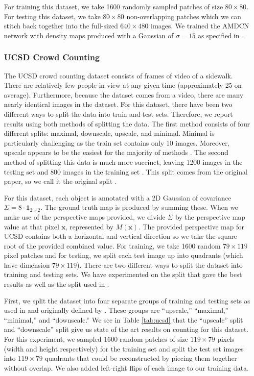 \documentclass[10pt,twocolumn,letterpaper]{article}
\begin{document}
For training this dataset, we take 1600 randomly sampled patches of size \(80 \times 80\). For testing this dataset, we take \(80 \times 80\) non-overlapping patches which we can stitch back together into the full-sized \(640 \times 480\) images. We trained the AMDCN network with density maps produced with a Gaussian of \(\sigma = 15\) as specified in \cite{rubio2016}.

\subsubsection{UCSD Crowd Counting}\label{sec:ucsd_explanation}

The UCSD crowd counting dataset consists of frames of video of a sidewalk. There are relatively few people in view at any given time (approximately 25 on average). Furthermore, because the dataset comes from a video, there are many nearly identical images in the dataset. For this dataset, there have been two different ways to split the data into train and test sets. Therefore, we report results using both methods of splitting the data. The first method consists of four different splits: maximal, downscale, upscale, and minimal. Minimal is particularly challenging as the train set contains only 10 images. Moreover, upscale appears to be the easiest for the majority of methods \cite{rubio2016}. The second method of splitting this data is much more succinct, leaving 1200 images in the testing set and 800 images in the training set \cite{zhang2016single}. This split comes from the original paper, so we call it the original split \cite{chan2008privacy}.

For this dataset, each object is annotated with a 2D Gaussian of covariance \(\Sigma = 8\cdot \mathbf{1}_{2 \times 2}\). The ground truth map is produced by summing these. When we make use of the perspective maps provided, we divide \(\Sigma\) by the perspective map value at that pixel \(\mathbf{x}\), represented by \(M(\mathbf{x})\). The provided perspective map for UCSD contains both a horizontal and vertical direction so we take the square root of the provided combined value. For training, we take 1600 random \(79 \times 119\) pixel patches and for testing, we split each test image up into quadrants (which have dimension \(79 \times 119\)). There are two different ways to split the dataset into training and testing sets. We have experimented on the split that gave \cite{rubio2016} the best results as well as the split used in \cite{zhang2016single}.

First, we split the dataset into four separate groups of training and testing sets as used in \cite{rubio2016} and originally defined by \cite{ryan2009crowd}. These groups are ``upscale,'' ``maximal,'' ``minimal,'' and ``downscale.'' We see in Table \ref{tab:ucsd} that the ``upscale'' split and ``downscale'' split give us state of the art results on counting for this dataset. For this experiment, we sampled 1600 random patches of size \(119 \times 79\) pixels (width and height respectively) for the training set and split the test set images into \(119 \times 79\) quadrants that could be reconstructed by piecing them together without overlap. We also added left-right flips of each image to our training data.
\end{document}
